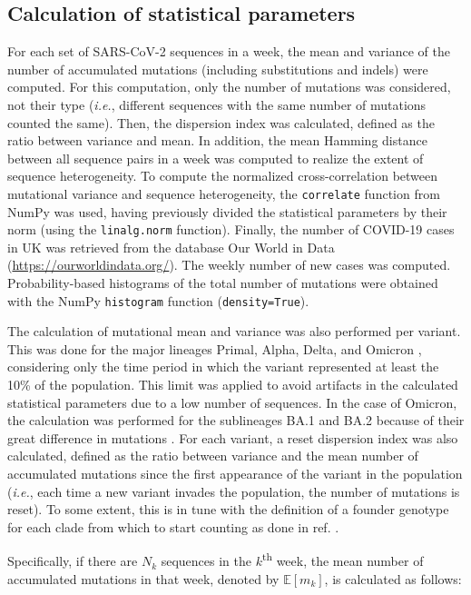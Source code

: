 \subsection{Calculation of statistical parameters}

For each set of SARS-CoV-2 sequences in a week, the mean and variance of the number of accumulated mutations (including substitutions and indels) were computed. For this computation, only the number of mutations was considered, not their type (\textit{i.e.}, different sequences with the same number of mutations counted the same). Then, the dispersion index was calculated, defined as the ratio between variance and mean. In addition, the mean Hamming distance between all sequence pairs in a week was computed to realize the extent of sequence heterogeneity. To compute the normalized cross-correlation between mutational variance and sequence heterogeneity, the \texttt{correlate} function from NumPy was used, having previously divided the statistical parameters by their norm (using the \texttt{linalg.norm} function). Finally, the number of COVID-19 cases in UK was retrieved from the database Our World in Data (\url{https://ourworldindata.org/}). The weekly number of new cases was computed. Probability-based histograms of the total number of mutations were obtained with the NumPy \texttt{histogram} function (\texttt{density=True}).

The calculation of mutational mean and variance was also performed per variant. This was done for the major lineages Primal, Alpha, Delta, and Omicron \cite{daCosta2022}, considering only the time period in which the variant represented at least the 10\% of the population. This limit was applied to avoid artifacts in the calculated statistical parameters due to a low number of sequences. In the case of Omicron, the calculation was performed for the sublineages BA.1 and BA.2 because of their great difference in mutations \cite{kumar2022}. For each variant, a reset dispersion index was also calculated, defined as the ratio between variance and the mean number of accumulated mutations since the first appearance of the variant in the population (\textit{i.e.}, each time a new variant invades the population, the number of mutations is reset). To some extent, this is in tune with the definition of a founder genotype for each clade from which to start counting as done in ref. \cite{neher2022}.

Specifically, if there are $N_k$ sequences in the $k$\textsuperscript{th} week, the mean number of accumulated mutations in that week, denoted by $\mathbb{E}\left[m_k\right]$, is calculated as follows:

